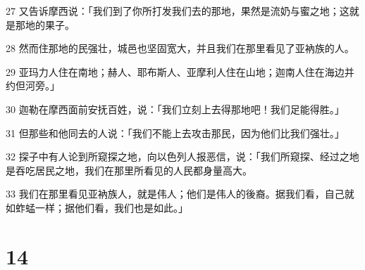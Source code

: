 \par 27 又告诉摩西说：「我们到了你所打发我们去的那地，果然是流奶与蜜之地；这就是那地的果子。
\par 28 然而住那地的民强壮，城邑也坚固宽大，并且我们在那里看见了亚衲族的人。
\par 29 亚玛力人住在南地；赫人、耶布斯人、亚摩利人住在山地；迦南人住在海边并约但河旁。」
\par 30 迦勒在摩西面前安抚百姓，说：「我们立刻上去得那地吧！我们足能得胜。」
\par 31 但那些和他同去的人说：「我们不能上去攻击那民，因为他们比我们强壮。」
\par 32 探子中有人论到所窥探之地，向以色列人报恶信，说：「我们所窥探、经过之地是吞吃居民之地，我们在那里所看见的人民都身量高大。
\par 33 我们在那里看见亚衲族人，就是伟人；他们是伟人的後裔。据我们看，自己就如蚱蜢一样；据他们看，我们也是如此。」

\chapter{14}

